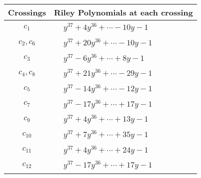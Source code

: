 \documentclass[1p]{elsarticle_modified}
\theoremstyle{definition}
\begin{document}
\begin{tabular}{m{50pt}|m{274pt}}
Crossings & \hspace{64pt}Riley Polynomials at each crossing \\
\hline $$\begin{aligned}c_{1}\end{aligned}$$&$\begin{aligned}
&y^{37}+4 y^{36}+\cdots-10 y-1
\end{aligned}$\\
\hline $$\begin{aligned}c_{2},c_{6}\end{aligned}$$&$\begin{aligned}
&y^{37}+20 y^{36}+\cdots-10 y-1
\end{aligned}$\\
\hline $$\begin{aligned}c_{3}\end{aligned}$$&$\begin{aligned}
&y^{37}-6 y^{36}+\cdots+8 y-1
\end{aligned}$\\
\hline $$\begin{aligned}c_{4},c_{8}\end{aligned}$$&$\begin{aligned}
&y^{37}+21 y^{36}+\cdots-29 y-1
\end{aligned}$\\
\hline $$\begin{aligned}c_{5}\end{aligned}$$&$\begin{aligned}
&y^{37}-14 y^{36}+\cdots-12 y-1
\end{aligned}$\\
\hline $$\begin{aligned}c_{7}\end{aligned}$$&$\begin{aligned}
&y^{37}-17 y^{36}+\cdots+17 y-1
\end{aligned}$\\
\hline $$\begin{aligned}c_{9}\end{aligned}$$&$\begin{aligned}
&y^{37}+4 y^{36}+\cdots+13 y-1
\end{aligned}$\\
\hline $$\begin{aligned}c_{10}\end{aligned}$$&$\begin{aligned}
&y^{37}+7 y^{36}+\cdots+35 y-1
\end{aligned}$\\
\hline $$\begin{aligned}c_{11}\end{aligned}$$&$\begin{aligned}
&y^{37}+4 y^{36}+\cdots+24 y-1
\end{aligned}$\\
\hline $$\begin{aligned}c_{12}\end{aligned}$$&$\begin{aligned}
&y^{37}-17 y^{36}+\cdots+17 y-1
\end{aligned}$\\
\hline
\end{tabular}
\vskip 2pc
\end{document}
